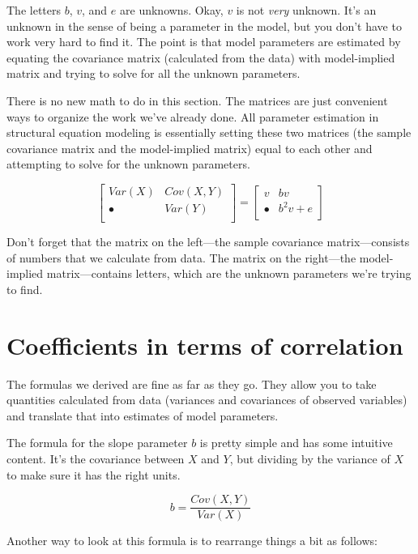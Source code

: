\documentclass[
]{book}
\begin{document}
The letters \(b\), \(v\), and \(e\) are unknowns. Okay, \(v\) is not \emph{very} unknown. It's an unknown in the sense of being a parameter in the model, but you don't have to work very hard to find it. The point is that model parameters are estimated by equating the covariance matrix (calculated from the data) with model-implied matrix and trying to solve for all the unknown parameters.

There is no new math to do in this section. The matrices are just convenient ways to organize the work we've already done. All parameter estimation in structural equation modeling is essentially setting these two matrices (the sample covariance matrix and the model-implied matrix) equal to each other and attempting to solve for the unknown parameters.

\[
\begin{bmatrix}
Var(X)       &    Cov(X, Y) \\
\bullet      &    Var(Y)    \\
\end{bmatrix} =
\begin{bmatrix}
v         &    bv         \\
\bullet   &    b^{2}v + e \\
\end{bmatrix}
\]

Don't forget that the matrix on the left---the sample covariance matrix---consists of numbers that we calculate from data. The matrix on the right---the model-implied matrix---contains letters, which are the unknown parameters we're trying to find.

\hypertarget{simple-coefficients-correlation}{%
\section{Coefficients in terms of correlation}\label{simple-coefficients-correlation}}

The formulas we derived are fine as far as they go. They allow you to take quantities calculated from data (variances and covariances of observed variables) and translate that into estimates of model parameters.

The formula for the slope parameter \(b\) is pretty simple and has some intuitive content. It's the covariance between \(X\) and \(Y\), but dividing by the variance of \(X\) to make sure it has the right units.

\[
b = \frac{Cov(X, Y)}{Var(X)}
\]

Another way to look at this formula is to rearrange things a bit as follows:
\end{document}

